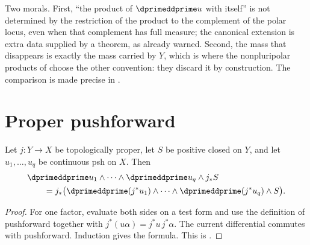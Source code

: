 \begin{example}
Two morals.  First, ``the product of $\dprimeddprime u$ with itself'' is not
determined by the restriction of the product to the complement of the polar
locus, even when that complement has full measure; the canonical extension
is extra data supplied by a theorem, as
 already warned.  Second, the mass that
disappears is exactly the mass carried by $Y$, which is where the
nonpluripolar products of  choose the other
convention: they discard it by construction.  The comparison is made precise
in .
\end{example}

\section{Proper pushforward}
\label{sec:ch16-pushforward}

\begin{proposition}
\label{prop:bt-projection-formula}
Let $j:Y\to X$ be topologically proper, let $S$ be positive closed on $Y$,
and let $u_1,\ldots,u_q$ be continuous psh on $X$.  Then
\[
\begin{split}
 &\dprimeddprime u_1\wedge\cdots\wedge\dprimeddprime u_q\wedge j_*S\\
 &\qquad=j_*\bigl(
 \dprimeddprime(j^*u_1)\wedge\cdots\wedge
 \dprimeddprime(j^*u_q)\wedge S\bigr).
\end{split}
\]
\end{proposition}
\begin{proof}
For one factor, evaluate both sides on a test form and use the definition of
pushforward together with
$j^*(u\alpha)=j^*u\,j^*\alpha$.  The current differential commutes with
pushforward.  Induction gives the formula.  This is
\cite[Proposition~8.7.5]{CLD25}.
\end{proof}

